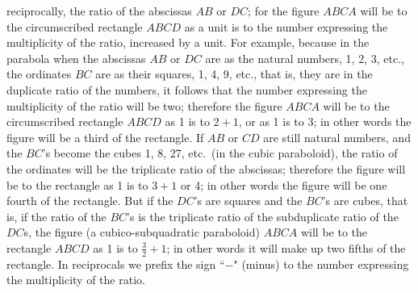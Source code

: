 \documentclass[polutonikogreek,english,twoside,openright]{article}
\begin{document}
reciprocally, the ratio of the abscissas $AB$ or $DC$; for the figure
$ABCA$ will be to the circumscribed rectangle $ABCD$ as a unit is to
the number expressing the multiplicity of the ratio, increased by a
unit. For example, because in
the parabola when the abscissas $AB$ or $DC$ are as the natural
numbers, 1, 2, 3, etc., the ordinates $BC$ are as their squares, 1, 4, 9, etc., that is,
they are in the duplicate ratio of the numbers, it follows that the
number expressing the multiplicity of the ratio will be two; therefore
the figure $ABCA$ will be to the circumscribed rectangle $ABCD$ as 1
is to $2+1$, or as 1 is to 3; in other words the figure will be a
third of the rectangle. If $AB$
or $CD$ are still natural numbers, and the $BC$'s become the cubes 1,
8, 27, etc.\ (in the cubic paraboloid), the ratio of the ordinates
will be the triplicate ratio of the abscissas; therefore the figure
will be to the rectangle as 1 is to $3+1$ or 4; in other words the
figure will be one fourth of the rectangle. But if the $DC$'s are squares and the $BC$'s are
cubes, that is, if the ratio of the $BC$'s is the triplicate ratio of
the subduplicate ratio of the $DC$s, the figure (a cubico-subquadratic
paraboloid) $ABCA$ will be to the rectangle $ABCD$ as 1 is to
$\frac{3}{2} + 1$; in other words it will make up two fifths of the
rectangle. In reciprocals we
prefix the sign ``$-$" (minus) to the number expressing the
multiplicity of the ratio.
\end{document}

